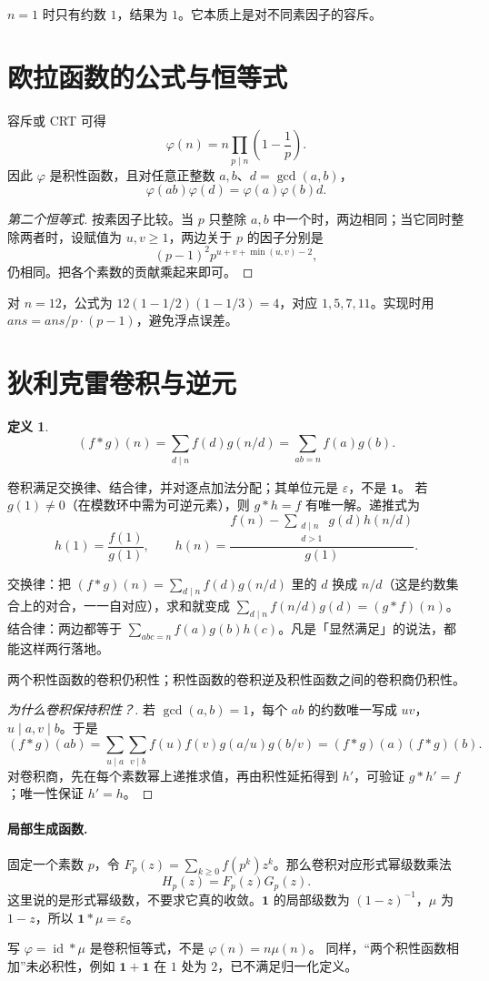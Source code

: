 \documentclass[UTF8,a4paper,11pt,twoside,openright,fontset=fandol]{ctexbook}
\theoremstyle{definition}
\newtheorem{definition}{定义}[chapter]
\newcommand{\eps}{\varepsilon}
\newcommand{\one}{\mathbf 1}
\newcommand{\id}{\operatorname{id}}
\begin{document}
$n=1$ 时只有约数 $1$，结果为 $1$。它本质上是对不同素因子的容斥。


\section{欧拉函数的公式与恒等式}
容斥或 CRT 可得
\[
 \varphi(n)=n\prod_{p\mid n}\left(1-\frac1p\right).
\]
因此 $\varphi$ 是积性函数，且对任意正整数 $a,b$、$d=\gcd(a,b)$，
\[
 \varphi(ab)\varphi(d)=\varphi(a)\varphi(b)d.
\]

\begin{proof}[第二个恒等式]
按素因子比较。当 $p$ 只整除 $a,b$ 中一个时，两边相同；当它同时整除两者时，设赋值为 $u,v\ge1$，两边关于 $p$ 的因子分别是
\[
 (p-1)^2p^{u+v+\min(u,v)-2},
\]
仍相同。把各个素数的贡献乘起来即可。
\end{proof}
对 $n=12$，公式为 $12(1-1/2)(1-1/3)=4$，对应 $1,5,7,11$。实现时用 $ans=ans/p\cdot(p-1)$，避免浮点误差。


\section{狄利克雷卷积与逆元}
\begin{definition}
\[
 (f*g)(n)=\sum_{d\mid n}f(d)g(n/d)=\sum_{ab=n}f(a)g(b).
\]
\end{definition}
卷积满足交换律、结合律，并对逐点加法分配；其单位元是 $\eps$，不是 $\one$。
若 $g(1)\ne0$（在模数环中需为可逆元素），则 $g*h=f$ 有唯一解。递推式为
\[
 h(1)=\frac{f(1)}{g(1)},\qquad
 h(n)=\frac{f(n)-\sum_{\substack{d\mid n\\d>1}}g(d)h(n/d)}{g(1)}.
\]

\begin{tip}[自己验证一次只要两行]
交换律：把 $(f*g)(n)=\sum_{d\mid n}f(d)g(n/d)$ 里的 $d$ 换成 $n/d$（这是约数集合上的对合，一一自对应），求和就变成 $\sum_{d\mid n}f(n/d)g(d)=(g*f)(n)$。结合律：两边都等于 $\sum_{abc=n}f(a)g(b)h(c)$。凡是「显然满足」的说法，都能这样两行落地。
\end{tip}

两个积性函数的卷积仍积性；积性函数的卷积逆及积性函数之间的卷积商仍积性。


\begin{proof}[为什么卷积保持积性？]
若 $\gcd(a,b)=1$，每个 $ab$ 的约数唯一写成 $uv$，$u\mid a,v\mid b$。于是
\[
 (f*g)(ab)=\sum_{u\mid a}\sum_{v\mid b}f(u)f(v)g(a/u)g(b/v)
 =(f*g)(a)(f*g)(b).
\]
对卷积商，先在每个素数幂上递推求值，再由积性延拓得到 $h'$，可验证 $g*h'=f$；唯一性保证 $h'=h$。
\end{proof}
\paragraph{局部生成函数.}
固定一个素数 $p$，令 $F_p(z)=\sum_{k\ge0}f(p^k)z^k$。那么卷积对应形式幂级数乘法
\[
 H_p(z)=F_p(z)G_p(z).
\]
这里说的是形式幂级数，不要求它真的收敛。$\one$ 的局部级数为 $(1-z)^{-1}$，$\mu$ 为 $1-z$，所以 $\one*\mu=\eps$。
\begin{pitfall}
写 $\varphi=\id*\mu$ 是卷积恒等式，不是 $\varphi(n)=n\mu(n)$。
同样，“两个积性函数相加”未必积性，例如 $\one+\one$ 在 $1$ 处为 $2$，已不满足归一化定义。
\end{pitfall}
\end{document}
